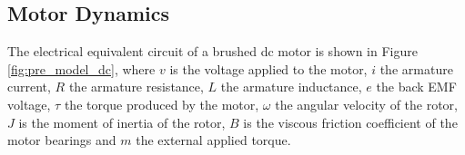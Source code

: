 
















\subsection{Motor Dynamics}

The electrical equivalent circuit of a brushed dc motor is shown in Figure \ref{fig:pre_model_dc}, where $v$ is the voltage applied to the motor, $i$ the armature current, $R$ the armature resistance, $L$ the armature inductance, $e$ the back EMF voltage, $\tau$ the torque produced by the motor, $\omega$ the angular velocity of the rotor, $J$ is the moment of inertia of the rotor, $B$ is the viscous friction coefficient of the motor bearings and $m$ the external applied torque.



